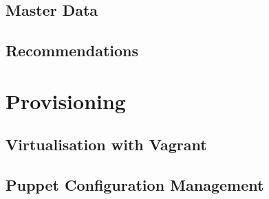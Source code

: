 \subsection{Master Data}

\subsection{Recommendations}

\section{Provisioning}

\subsection{Virtualisation with Vagrant}

\subsection{Puppet Configuration Management}
